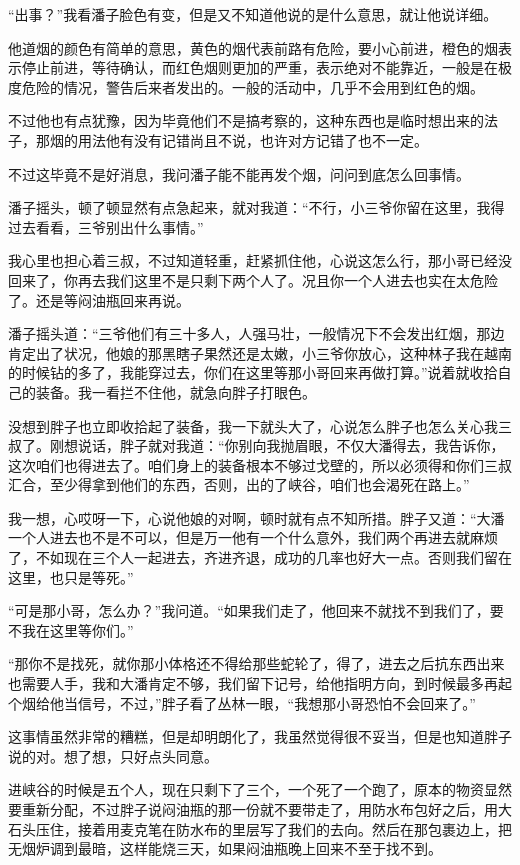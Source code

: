“出事？”我看潘子脸色有变，但是又不知道他说的是什么意思，就让他说详细。

他道烟的颜色有简单的意思，黄色的烟代表前路有危险，要小心前进，橙色的烟表示停止前进，等待确认，而红色烟则更加的严重，表示绝对不能靠近，一般是在极度危险的情况，警告后来者发出的。一般的活动中，几乎不会用到红色的烟。

不过他也有点犹豫，因为毕竟他们不是搞考察的，这种东西也是临时想出来的法子，那烟的用法他有没有记错尚且不说，也许对方记错了也不一定。

不过这毕竟不是好消息，我问潘子能不能再发个烟，问问到底怎么回事情。

潘子摇头，顿了顿显然有点急起来，就对我道：“不行，小三爷你留在这里，我得过去看看，三爷别出什么事情。”

我心里也担心着三叔，不过知道轻重，赶紧抓住他，心说这怎么行，那小哥已经没回来了，你再去我们这里不是只剩下两个人了。况且你一个人进去也实在太危险了。还是等闷油瓶回来再说。

潘子摇头道：“三爷他们有三十多人，人强马壮，一般情况下不会发出红烟，那边肯定出了状况，他娘的那黑瞎子果然还是太嫩，小三爷你放心，这种林子我在越南的时候钻的多了，我能穿过去，你们在这里等那小哥回来再做打算。”说着就收拾自己的装备。我一看拦不住他，就急向胖子打眼色。

没想到胖子也立即收拾起了装备，我一下就头大了，心说怎么胖子也怎么关心我三叔了。刚想说话，胖子就对我道：“你别向我抛眉眼，不仅大潘得去，我告诉你，这次咱们也得进去了。咱们身上的装备根本不够过戈壁的，所以必须得和你们三叔汇合，至少得拿到他们的东西，否则，出的了峡谷，咱们也会渴死在路上。”

我一想，心哎呀一下，心说他娘的对啊，顿时就有点不知所措。胖子又道：“大潘一个人进去也不是不可以，但是万一他有一个什么意外，我们两个再进去就麻烦了，不如现在三个人一起进去，齐进齐退，成功的几率也好大一点。否则我们留在这里，也只是等死。”

“可是那小哥，怎么办？”我问道。“如果我们走了，他回来不就找不到我们了，要不我在这里等你们。”

“那你不是找死，就你那小体格还不得给那些蛇轮了，得了，进去之后抗东西出来也需要人手，我和大潘肯定不够，我们留下记号，给他指明方向，到时候最多再起个烟给他当信号，不过，”胖子看了丛林一眼，“我想那小哥恐怕不会回来了。”

这事情虽然非常的糟糕，但是却明朗化了，我虽然觉得很不妥当，但是也知道胖子说的对。想了想，只好点头同意。

进峡谷的时候是五个人，现在只剩下了三个，一个死了一个跑了，原本的物资显然要重新分配，不过胖子说闷油瓶的那一份就不要带走了，用防水布包好之后，用大石头压住，接着用麦克笔在防水布的里层写了我们的去向。然后在那包裹边上，把无烟炉调到最暗，这样能烧三天，如果闷油瓶晚上回来不至于找不到。

